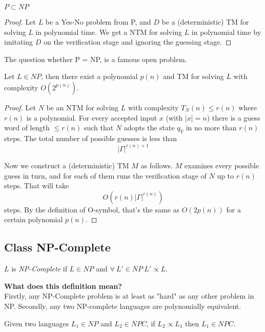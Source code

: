 \begin{theorem}
    $P \subset NP$
\end{theorem}
\begin{proof}
    Let $L$ be a Yes-No problem from P,
    and $D$ be a (deterministic) TM for solving $L$ in polynomial time.
    We get a NTM for solving $L$ in polynomial time by imitating $D$ on the verification stage
    and ignoring the guessing stage.
\end{proof}

\begin{center}
The question whether P = NP, is a famous open problem.
\end{center}

\begin{theorem}
    Let $L \in NP$,
    then there exist a polynomial $p(n)$ and TM for solving $L$ with complexity $O(2^{p(n)})$.
\end{theorem}
\begin{proof}
    Let $N$ be an NTM for solving $L$ with complexity $T_N(n) \leq r(n)$
    where $r(n)$ is a polynomial.
    For every accepted input $x$ (with $|x| = n$)
    there is a guess word of length $\leq r(n)$
    such that $N$ adopts the state $q_Y$ in no more than $r(n)$ steps.
    The total number of possible guesses is less than
    $$|\Gamma|^{r(n)+1}$$

    Now we construct a (deterministic) TM $M$ as follows.
    $M$ examines every possible guess in turn,
    and for each of them runs the verification stage of $N$ up to $r(n)$ steps.
    That will take $$O(r(n)|\Gamma|^{r(n)})$$ steps.
    By the definition of O-symbol, that’s the same as $O(2p(n))$ for a certain polynomial $p(n)$.
\end{proof}

\subsection{Class NP-Complete}
\begin{definition}
    $L$ is \textit{NP-Complete} if $L \in NP$ and
    $\forall\ L\prime \in NP\ L\prime \propto L$.
\end{definition}

\textbf{What does this definition mean?}\\
Firstly, any NP-Complete problem is at least as "hard" as any other problem in NP.
Secondly, any two NP-complete languages are polynomially equivalent.

\begin{theorem}
    Given two languages $L_1 \in NP$ and $L_2 \in NPC$,
    if $L_2 \propto L_1$ then $L_1 \in NPC$.
\end{theorem}

